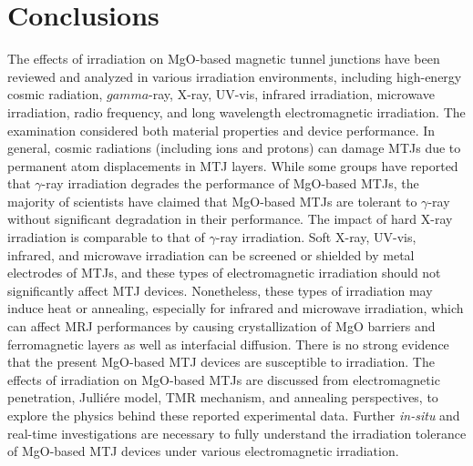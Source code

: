\documentclass[molecules,review,submit,pdftex,moreauthors]{Definitions/mdpi}
\begin{document}
\section{Conclusions}

The effects of irradiation on MgO-based magnetic tunnel junctions have been reviewed and analyzed in various irradiation environments, including high-energy cosmic radiation, $gamma$-ray, X-ray, UV-vis, infrared irradiation, microwave irradiation, radio frequency, and long wavelength electromagnetic irradiation.  The examination considered both  material properties and device performance.  In general, cosmic radiations (including ions and protons) can damage MTJs due to permanent atom displacements in MTJ layers.  While some groups have reported that $\gamma$-ray irradiation degrades the performance of MgO-based MTJs, the majority of scientists have claimed that MgO-based MTJs are tolerant to $\gamma$-ray without significant degradation in their performance.  The impact of hard X-ray irradiation is comparable to that of $\gamma$-ray irradiation.  Soft X-ray, UV-vis, infrared, and microwave irradiation can be screened or shielded by metal electrodes of MTJs, and these types of electromagnetic irradiation should not significantly affect MTJ devices.  Nonetheless, these types of irradiation may induce heat or annealing, especially for infrared and microwave irradiation, which can affect MRJ performances by causing crystallization of MgO barriers and ferromagnetic layers as well as interfacial diffusion.  There is no strong evidence that the present MgO-based MTJ devices are susceptible to irradiation.  The effects of irradiation on MgO-based MTJs are discussed from electromagnetic penetration, Julli\'{e}re model, TMR mechanism, and annealing perspectives, to explore the physics behind these reported experimental data.  Further \textit{in-situ} and real-time investigations are necessary to fully understand the irradiation tolerance of MgO-based MTJ devices under various electromagnetic irradiation. 


\vspace{6pt} 


\end{document}
